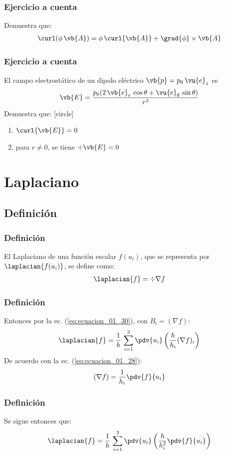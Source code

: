 \begin{frame}
\frametitle{Ejercicio a cuenta}
Demuestra que:
\begin{align*}
\curl(\phi \, \vb{A}) = \phi \, \curl{\vb{A}} + \grad{\phi} \times \vb{A}
\end{align*}
\end{frame}
\begin{frame}
\frametitle{Ejercicio a cuenta}
El campo electrostático de un dipolo eléctrico $\vb{p} = p_{0} \, \vu{e}_{z}$ es
\begin{align*}
\vb{E} = \dfrac{p_{0} (2 \, \vb{e}_{r} \, \cos \theta + \vu{e}_{\theta} \, \sin \theta)}{r^{3}}
\end{align*}
Demuestra que:
[circle]
\begin{enumerate}
\item $\curl{\vb{E}} = 0$
\item para $r \neq 0$, se tiene $\div{\vb{E}} = 0$
\end{enumerate}
\end{frame}
\section{Laplaciano}
\subsection{Definición}
\begin{frame}
\frametitle{Definición}
El Laplaciano de una función escalar $f(u_{i})$, que se representa por $\laplacian{f(u_{i})}$, se define como:
\begin{align*}
\laplacian{f} = \div{\nabla f}
\end{align*}
\end{frame}
\begin{frame}
\frametitle{Definición}
Entonces por la ec. (\ref{eq:ecuacion_01_30}), con $B_{i} = (\nabla f)$:
\begin{align*}
\laplacian{f} = \dfrac{1}{h} \, \sum_{i=1}^{3} \pdv{u_{i}} \left( \dfrac{h}{h_{i}}  (\nabla f)_{i} \right)
\end{align*}
\pause
De acuerdo con la ec. (\ref{eq:ecuacion_01_28}):
\begin{align*}
(\nabla f) = \dfrac{1}{h_{i}} \pdv{f}{u_{i}}
\end{align*}
\end{frame}
\begin{frame}
\frametitle{Definición}
Se sigue entonces que:
\begin{align}
\laplacian{f} = \dfrac{1}{h} \, \sum_{i=1}^{3} \pdv{u_{i}} \left( \dfrac{h}{h_{i}^{2}}  \pdv{f}{u_{i}} \right)
\label{eq:ecuacion_01_36}
\end{align}
\end{frame}
